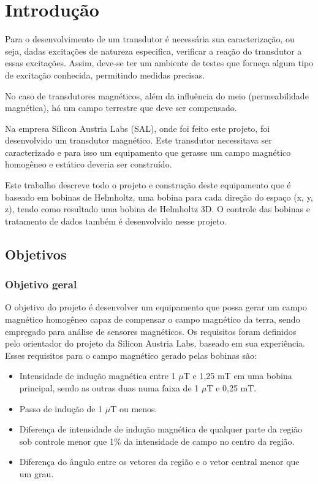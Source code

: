 \chapter{Introdução}

Para o desenvolvimento de um transdutor é necessária sua caracterização, ou seja, dadas excitações de natureza especifica, verificar a reação do transdutor a essas excitações. Assim, deve-se ter um ambiente de testes que forneça algum tipo de excitação conhecida, permitindo medidas precisas.

No caso de transdutores magnéticos, além da influência do meio (permeabilidade magnética), há um campo terrestre que deve ser compensado.

Na empresa Silicon Austria Labs (SAL), onde foi feito este projeto, foi desenvolvido um transdutor magnético. Este transdutor necessitava ser caracterizado e para isso um equipamento que gerasse um campo magnético homogêneo e estático deveria ser construído.

Este trabalho descreve todo o projeto e construção deste equipamento que é baseado em bobinas de Helmholtz, uma bobina para cada direção do espaço (x, y, z), tendo como resultado uma bobina de Helmholtz 3D. O controle das bobinas e tratamento de dados também é desenvolvido nesse projeto.

\section{Objetivos}

\subsection{Objetivo geral}

O objetivo do projeto é desenvolver um equipamento que possa gerar um campo magnético homogêneo capaz de compensar o campo magnético da terra, sendo empregado para análise de sensores magnéticos. 
Os requisitos foram definidos pelo orientador do projeto da Silicon Austria Labs, baseado em sua experiência. Esses requisitos para o campo magnético gerado pelas bobinas são:

\begin{itemize}
    \item Intensidade de indução magnética entre 1 $\mu$T e 1,25 mT em uma bobina principal, sendo as outras duas numa faixa de 1 $\mu$T e 0,25 mT.
    \item Passo de indução de 1 $\mu$T ou menos.
    \item Diferença de intensidade de indução magnética de qualquer parte da região sob controle menor que 1\% da intensidade de campo no centro da região.
    \item Diferença do ângulo entre os vetores da região e o vetor central menor que um grau.
\end{itemize}

